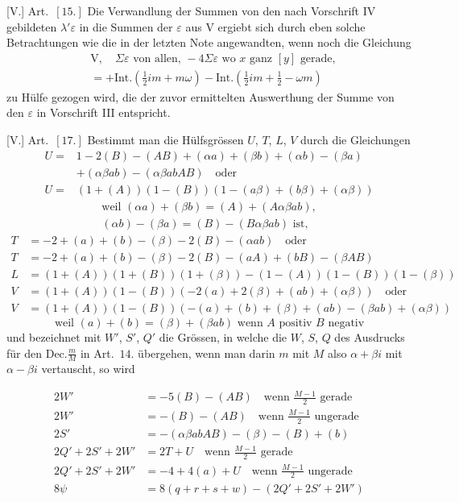[V.] Art.\ $[15.]$ Die Verwandlung der Summen von den nach Vorschrift IV gebildeten $\lambda'\varepsilon$ in die Summen der $\varepsilon$ aus V ergiebt sich durch eben solche Betrachtungen wie die in der letzten Note angewandten, wenn noch die Gleichung
\[
\begin{aligned}
&\mathrm V,\quad\Sigma\varepsilon\text{ von allen, }-4\Sigma\varepsilon\text{ wo }x\text{ ganz }[y]\text{ gerade},\\
&=+\mathrm{Int.}(\tfrac12im+m\omega)-\mathrm{Int.}(\tfrac12im+\tfrac12-\omega m)
\end{aligned}
\]
zu Hülfe gezogen wird, die der zuvor ermittelten Auswerthung der Summe von den $\varepsilon$ in Vorschrift III entspricht.

[V.] Art.\ $[17.]$ Bestimmt man die Hülfsgrössen $U$, $T$, $L$, $V$ durch die Gleichungen
\[
\begin{aligned}
U={}&1-2(B)-(AB)+(\alpha a)+(\beta b)+(\alpha b)-(\beta a)\\
&+(\alpha\beta ab)-(\alpha\beta abAB)\quad\text{oder}\\
U={}&(1+(A))(1-(B))(1-(a\beta)+(b\beta)+(\alpha\beta))
\end{aligned}
\]
\[
\begin{gathered}
\text{weil }(\alpha a)+(\beta b)=(A)+(A\alpha\beta ab),\\
(\alpha b)-(\beta a)=(B)-(B\alpha\beta ab)\text{ ist},
\end{gathered}
\]
\[
\begin{aligned}
T&=-2+(a)+(b)-(\beta)-2(B)-(\alpha ab)\quad\text{oder}\\
T&=-2+(a)+(b)-(\beta)-2(B)-(aA)+(bB)-(\beta AB)\\
L&=(1+(A))(1+(B))(1+(\beta))-(1-(A))(1-(B))(1-(\beta))\\
V&=(1+(A))(1-(B))(-2(a)+2(\beta)+(ab)+(\alpha\beta))\quad\text{oder}\\
V&=(1+(A))(1-(B))(-(a)+(b)+(\beta)+(ab)-(\beta ab)+(\alpha\beta))
\end{aligned}
\]
\[
\text{weil }(a)+(b)=(\beta)+(\beta ab)\text{ wenn }A\text{ positiv }B\text{ negativ}
\]
und bezeichnet mit $W'$, $S'$, $Q'$ die Grössen, in welche die $W$, $S$, $Q$ des Ausdrucks für den $\mathrm{Dec.}\frac mM$ in Art.\ $14$. übergehen, wenn man darin $m$ mit $M$ also $\alpha+\beta i$ mit $\alpha-\beta i$ vertauscht, so wird

%
\[
\begin{aligned}
2W'&=-5(B)-(AB)\quad\text{wenn }\frac{M-1}{2}\text{ gerade}\\
2W'&=-(B)-(AB)\quad\text{wenn }\frac{M-1}{2}\text{ ungerade}\\
2S'&=-(\alpha\beta abAB)-(\beta)-(B)+(b)\\
2Q'+2S'+2W'&=2T+U\quad\text{wenn }\frac{M-1}{2}\text{ gerade}\\
2Q'+2S'+2W'&=-4+4(a)+U\quad\text{wenn }\frac{M-1}{2}\text{ ungerade}\\
8\psi&=8(q+r+s+w)-(2Q'+2S'+2W')
\end{aligned}
\]

